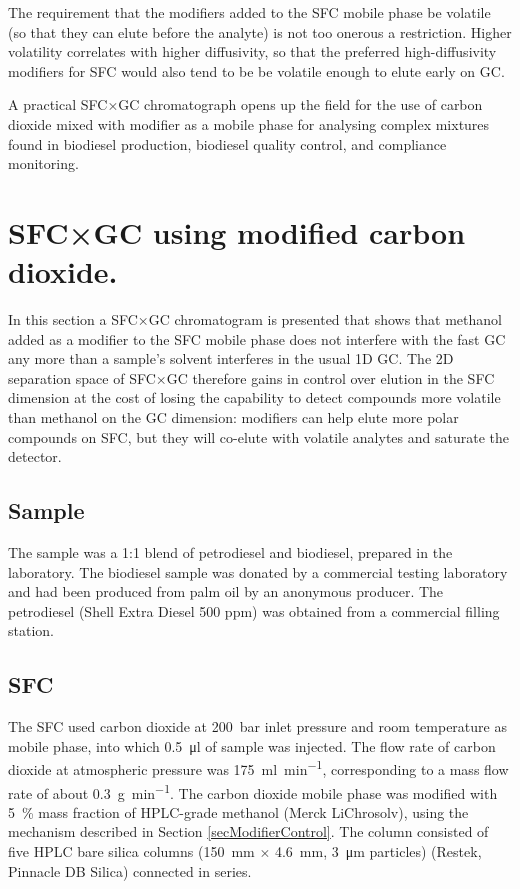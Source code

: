 The requirement that the modifiers added to the SFC mobile phase be volatile (so
that they can elute before the analyte) is not too onerous a restriction. Higher
volatility correlates with higher diffusivity, so that the preferred
high-diffusivity modifiers for SFC  would also tend to be be volatile enough to
elute early on GC. 

A practical SFC×GC chromatograph opens up the field for the use of carbon
dioxide mixed with modifier as a mobile phase for analysing complex mixtures
found in biodiesel production, biodiesel quality control, and compliance
monitoring.

\section[SFC×GC with modifier]{SFC×GC using modified carbon dioxide.}

In this section a SFC×GC chromatogram is presented that shows that methanol
added as a modifier to the SFC mobile phase does not interfere with the fast GC
any more than a sample's solvent interferes in the usual 1D GC. The 2D
separation space of SFC×GC therefore gains in control over elution in the SFC
dimension at the cost of losing the capability to detect compounds more volatile
than methanol on the GC dimension: modifiers can help elute more polar compounds
on SFC, but they will co-elute with volatile analytes and saturate the detector.

\subsection{Sample}

The sample was a 1:1 blend of petrodiesel and biodiesel, prepared in the
laboratory. The biodiesel sample was donated by a commercial testing laboratory
and had been produced from palm oil by an anonymous producer. The petrodiesel
(Shell Extra Diesel 500 ppm) was obtained from a commercial filling station.

\subsection{SFC}

The SFC used carbon dioxide at \SI{200}{\bar} inlet pressure and room
temperature as mobile phase, into which \SI{0.5}{\micro\litre} of sample was
injected. The flow rate of carbon dioxide at atmospheric pressure was
\SI{175}{\milli\litre\per\minute}, corresponding to a mass flow rate of about
\SI{0.3}{\gram\per\minute}. The carbon dioxide mobile phase was modified with
\SI{5}{\percent} mass fraction of HPLC-grade methanol (Merck LiChrosolv), using
the mechanism described in Section \ref{secModifierControl}.
The column consisted of five HPLC bare silica columns (\SI{150}{\milli\metre}
$\times$ \SI{4.6}{\milli\metre}, \SI{3}{\micro\metre} particles) (Restek,
Pinnacle DB Silica) connected in series.

